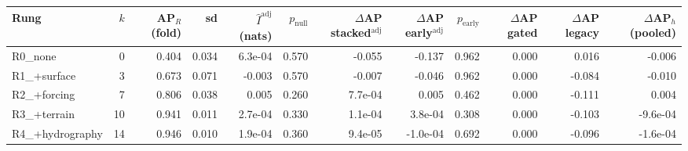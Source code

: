 \begin{tabular}{lrrrrrrrrrrr}
\toprule
Rung & $k$ & AP$_R$ (fold) & sd & $\hat I^{\mathrm{adj}}$ (nats) & $p_{\mathrm{null}}$ & $\Delta$AP stacked$^{\mathrm{adj}}$ & $\Delta$AP early$^{\mathrm{adj}}$ & $p_{\mathrm{early}}$ & $\Delta$AP gated & $\Delta$AP legacy & $\Delta$AP$_h$ (pooled) \\
\midrule
R0\_none & 0 & 0.404 & 0.034 & 6.3e-04 & 0.570 & -0.055 & -0.137 & 0.962 & 0.000 & 0.016 & -0.006 \\
R1\_+surface & 3 & 0.673 & 0.071 & -0.003 & 0.570 & -0.007 & -0.046 & 0.962 & 0.000 & -0.084 & -0.010 \\
R2\_+forcing & 7 & 0.806 & 0.038 & 0.005 & 0.260 & 7.7e-04 & 0.005 & 0.462 & 0.000 & -0.111 & 0.004 \\
R3\_+terrain & 10 & 0.941 & 0.011 & 2.7e-04 & 0.330 & 1.1e-04 & 3.8e-04 & 0.308 & 0.000 & -0.103 & -9.6e-04 \\
R4\_+hydrography & 14 & 0.946 & 0.010 & 1.9e-04 & 0.360 & 9.4e-05 & -1.0e-04 & 0.692 & 0.000 & -0.096 & -1.6e-04 \\
\bottomrule
\end{tabular}
